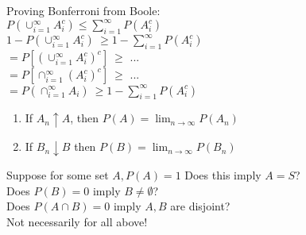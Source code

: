 \documentclass[12pt, oneside, letterpaper]{notes}
\begin{document}
\begin{remark}
	Proving Bonferroni from Boole: \\
	$P(\cup_{i=1}^{\infty} A_i^c) 
	\leq \sum_{i=1}^{\infty} P(A_i^c)$ \\
	$1- P(\cup_{i=1}^{\infty} A_i^c) \:  
	\geq 1 - \sum_{i=1}^{\infty} P(A_i^c)$ \\
	$ = P[(\cup_{i=1}^{\infty} A_i^c)^c] \: 
	\geq$ ...  \\
	$ = P[\cap_{i=1}^{\infty} (A_i^c)^c] \: 
	\geq$ ... \\
	$ = P(\cap_{i=1}^{\infty} A_i ) \: 
	\geq 1- \sum_{i=1}^{\infty} P(A_i^c)$ 
\end{remark}

\begin{enumerate}
	\item If $A_n \uparrow A$, then $P(A) = \lim_{n \to \infty} P(A_n)$ 

	\item If $B_n \downarrow B$ then $P(B) = \lim_{n \to \infty} P(B_n)$ 
\end{enumerate}

%
%

\begin{remark}
	Suppose for some set $A, P(A) = 1$ Does this imply $A=S$? \\
	Does $P(B) = 0$ imply $B \neq \emptyset$? \\
	Does $P(A \cap B) = 0$ imply $A,B$ are disjoint? \\
	Not necessarily for all above! 
\end{remark}

%
%
\end{document}
